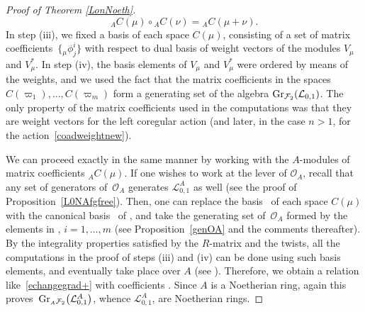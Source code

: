 \documentclass[pdftex]{sigma}
\numberwithin{equation}{section}
\theoremstyle{definition}
\newcommand{\Ll}{{\mathcal L}}
\newcommand{\Oo}{{\mathcal O}}
\newcommand{\smallbullet}{%
\vcenter{\hbox{\,\scalebox{0.5}{$\bullet$}\,}}
}
\begin{document}
\begin{proof}[Proof of Theorem \ref{LonNoeth}]
\[%
{}_AC(\mu) \circ{}_AC(\nu) = {}_AC(\mu + \nu).
\]
In step (iii), we fixed a basis of each space $C(\mu)$, consisting of a set of matrix coefficients~$\big\{{}_\mu\phi^i_j\big\}$ with respect to dual basis of weight vectors of the modules $V_\mu$ and $V_\mu^*$. In step (iv), the basis elements of $V_\mu$ and $V_\mu^*$ were ordered by means of the weights, and we used the fact that the matrix coefficients in the spaces $C(\varpi_1),\dots,C(\varpi_m)$ form a generating set of the algebra $ {\rm Gr}_{\mathcal{F}_2}({\mathcal L}_{0,1})$. The only property of the matrix coefficients used in the computations was that they are weight vectors for the left coregular action (and later, in the case $n>1$, for the action~\eqref{coadweightnew}).

We can proceed exactly in the same manner by working with the $A$-modules of matrix coefficients ${}_AC(\mu)$. If one wishes to work at the lever of $\Oo_A$, recall that any set of generators of~$\Oo_A$ generates $\Ll_{0,1}^A$ as well (see the proof of Proposition~\ref{L0NAfgfree}). Then, one can replace the basis~ of each space $C(\mu)$ with the canonical basis~ of \smash{${}_A \overset{\raisebox{-1.5pt}{\scriptsize$\smallbullet$}}{C} (\mu)$}, and take the generating set of~$\Oo_A$ formed by the elements in , $i=1,\dots,m$ (see Proposition~\ref{genOA} and the comments thereafter). By the integrality properties satisfied by the $R$-matrix and the twists, all the computations in the proof of steps (iii) and (iv) can be done using such basis elements, and eventually take place over $A$ (see \cite[Propositions 4.10 and 6.9]{BR}). Therefore, we obtain a relation like~\eqref{echangegrad+} with coefficients . Since $A$ is a Noetherian ring, again this proves~${ {\rm Gr}_{ {}_A\mathcal{F}_2}\big({\mathcal L}_{0,1}^A\big)}$, whence ${\mathcal L}_{0,1}^A$, are Noetherian rings.


\end{proof}
\end{document}
